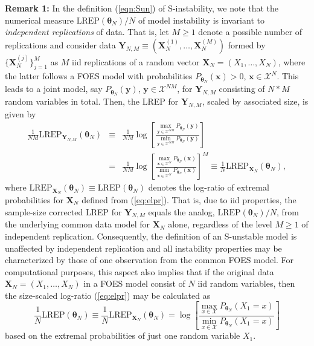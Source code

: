 \documentclass[12pt]{article}
\theoremstyle{definition}
\newcommand{\REP}{\mathrm{LREP}}
\begin{document}
\noindent \textbf{Remark 1:}   In the definition (\ref{eqn:Sun}) of S-instability, we note that the numerical measure $\REP(\boldsymbol \theta_N)/N$ of model instability is invariant to {\it independent  replications} of data.
 That is, let $M \geq 1$ denote a possible number of replications and
 consider data \(  \boldsymbol Y_{N,M} \equiv (\boldsymbol X^{(1)}_N, \dots, \boldsymbol X^{(M)}_N)\)
formed by $\{ \boldsymbol X^{(j)}_N\}_{j=1}^M$ as
  \(M\)  iid replications of a random vector $\boldsymbol X_N=(X_1,\ldots,X_N)$, where the latter follows a
  FOES model with probabilities \(P_{ \boldsymbol \theta_N}(\boldsymbol x)>0\), $\boldsymbol x\in\mathcal{X}^N$.
   This leads
to a joint model, say $P_{ \boldsymbol \theta_N}(\boldsymbol y)$, $\boldsymbol y\in\mathcal{X}^{NM}$, for $\boldsymbol Y_{N,M}$ consisting of  \(N*M\) random variables in total.  Then, the  LREP for $\boldsymbol Y_{N,M}$, scaled by associated size, is given by
\begin{eqnarray*}
\frac{1}{NM}\REP_{\boldsymbol Y_{N,M}}( \boldsymbol\theta_N ) &\equiv &\frac{1}{NM}\log\left[\frac{\max_{\boldsymbol y \in \mathcal{X}^{NM}}P_{ \boldsymbol \theta_N}(\boldsymbol y)  }{\min_{\boldsymbol y \in \mathcal{X}^{NM}}P_{ \boldsymbol \theta_N}(\boldsymbol y)} \right]\\&=&\frac{1}{NM}\log\left[\frac{\max_{\boldsymbol x \in \mathcal{X}^{N}}P_{ \boldsymbol \theta_N}(\boldsymbol x)  }{\min_{\boldsymbol x \in \mathcal{X}^{N}}P_{ \boldsymbol \theta_N}(\boldsymbol x)} \right]^M \equiv\frac{1}{N}\REP_{\boldsymbol X_{N}}( \boldsymbol\theta_N ),
\end{eqnarray*}
where $\REP_{\boldsymbol X_{N}}( \boldsymbol\theta_N )  \equiv \REP( \boldsymbol\theta_N ) $ denotes the log-ratio of extremal probabilities for $\boldsymbol X_N$ defined from (\ref{eq:elpr}).
That is, due to iid properties,
the sample-size corrected  LREP for   $\boldsymbol Y_{N,M}$ equals the analog, $\REP( \boldsymbol\theta_N )/N$, from the underlying common data model for $\boldsymbol X_N$ alone, regardless of the level $M \geq 1$ of independent replication.
 Consequently,   the definition of an S-unstable  model  is  unaffected by independent replication and all   instability properties  may be characterized by those of one
observation  from the common FOES model.  For  computational purposes, this aspect also implies that if the original data $\boldsymbol X_N=(X_1,\ldots,X_N)$ in a FOES model
consist of $N$ iid random variables, then the size-scaled log-ratio (\ref{eq:elpr})  may be calculated as
\[
\frac{1}{N}\REP( \boldsymbol\theta_N ) \equiv \frac{1}{N}\REP_{\boldsymbol X_{N}}( \boldsymbol\theta_N ) = \log\left[ \frac{\max_{ x \in \mathcal{X}}P_{\boldsymbol\theta_N}(X_1=x)} {\min_{ x \in \mathcal{X}}P_{\boldsymbol\theta_N}(X_1=x)} \right]
\]
based on the extremal probabilities of just one random variable $X_1$.
\end{document}
